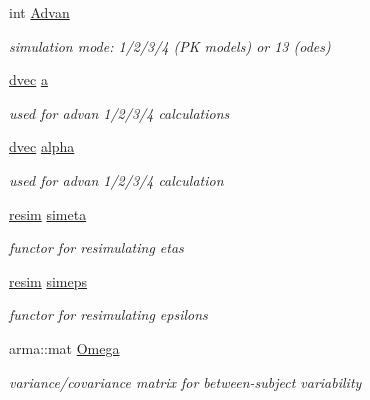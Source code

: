 \begin{DoxyCompactItemize}
int \hyperlink{classodeproblem_a03f5d0954b46554399ff09ee131f9071}{Advan}
\begin{DoxyCompactList}\small\item\em simulation mode\+: 1/2/3/4 (PK models) or 13 (odes) \end{DoxyCompactList}\item 
\mbox{\label{classodeproblem_a2e097ea96af2c293904053e764e63263}} 
\hyperlink{mrgsolv_8h_ac6aa1a2351760492203846ae74778c05}{dvec} \hyperlink{classodeproblem_a2e097ea96af2c293904053e764e63263}{a}
\begin{DoxyCompactList}\small\item\em used for advan 1/2/3/4 calculations \end{DoxyCompactList}\item 
\mbox{\label{classodeproblem_a2cc33c6e54bfecab2128965d712f4ddf}} 
\hyperlink{mrgsolv_8h_ac6aa1a2351760492203846ae74778c05}{dvec} \hyperlink{classodeproblem_a2cc33c6e54bfecab2128965d712f4ddf}{alpha}
\begin{DoxyCompactList}\small\item\em used for advan 1/2/3/4 calculation \end{DoxyCompactList}\item 
\mbox{\label{classodeproblem_a4f2c3157beb52a27c029b4cb7bb8d7e5}} 
\hyperlink{structresim}{resim} \hyperlink{classodeproblem_a4f2c3157beb52a27c029b4cb7bb8d7e5}{simeta}
\begin{DoxyCompactList}\small\item\em functor for resimulating etas \end{DoxyCompactList}\item 
\mbox{\label{classodeproblem_a312484a436a3bb0ea55276fa97d23fb5}} 
\hyperlink{structresim}{resim} \hyperlink{classodeproblem_a312484a436a3bb0ea55276fa97d23fb5}{simeps}
\begin{DoxyCompactList}\small\item\em functor for resimulating epsilons \end{DoxyCompactList}\item 
\mbox{\label{classodeproblem_a38b999143a87c562d9db57e5fb82aa83}} 
arma\+::mat \hyperlink{classodeproblem_a38b999143a87c562d9db57e5fb82aa83}{Omega}
\begin{DoxyCompactList}\small\item\em variance/covariance matrix for between-\/subject variability \end{DoxyCompactList}\item 

\end{DoxyCompactItemize}
